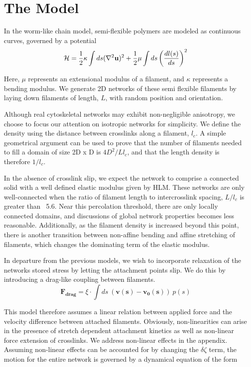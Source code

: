 \documentclass[prb,11pt]{revtex4-1}
\begin{document}
\section{The Model}

In the worm-like chain model, semi-flexible polymers are modeled as continuous curves, governed by a potential 
\begin{equation}
{\cal H} =\frac{1}{2}\kappa \int ds(\nabla^2\mathbf{u})^2 + \frac{1}{2}\mu \int ds \left ( \frac{dl(s) }{ds} \right )^2
\end{equation}

Here, $\mu$ represents an extensional modulus of a filament, and $\kappa$ represents a bending modulus.  We generate 2D networks of these semi flexible filaments by laying down filaments of length, $L$, with random position and orientation.  

Although real cytoskeletal networks may exhibit non-negligible anisotropy, we choose to focus our attention on isotropic networks for simplicity.  We define the density using the distance between crosslinks along a filament, $l_c$. A simple geometrical argument can be used to prove that the number of filaments needed to fill a domain of size 2D x D is $4D^2/Ll_c$, and that the length density is therefore $1/l_c$. 

In the absence of crosslink slip, we expect the network to comprise a connected solid with a well defined elastic modulus given by HLM.  These networks are only well-connected when the ratio of filament length to intercrosslink spacing, $L/l_c$ is greater than ~5.6.  Near this percolation threshold, there are only locally connected domains, and discussions of global network properties becomes less reasonable.  Additionally, as the filament density is increased beyond this point, there is another transition between non-affine bending and affine stretching of filaments, which changes the dominating term of the elastic modulus.

In departure from the previous models, we wish to incorporate relaxation of the networks stored stress by letting the attachment points slip.  We do this by introducing a drag-like coupling between filaments.
\begin{equation}
\mathbf{F_{drag}} = \xi \cdot \int ds \: (\mathbf{v(s)}-\mathbf{v_0(s)}) \: p(s)
\end{equation}

This model therefore assumes a linear relation between applied force and the velocity difference between attached filaments.  Obviously, non-linearities can arise in the presence of stretch dependent attachment kinetics as well as non-linear force extension of crosslinks.  We address non-linear effects in the appendix.  Assuming non-linear effects can be accounted for by changing the $\delta \zeta$ term, the motion for the entire network is governed by a dynamical equation of the form
\end{document}
